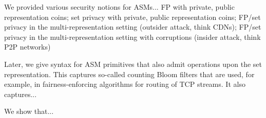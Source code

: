 We provided various security notions for ASMs... FP with private, public representation coins; set privacy with private, public representation coins; FP/set privacy in the multi-representation setting (outsider attack, think CDNs); FP/set privacy in the multi-representation setting with corruptions (insider attack, think P2P networks) 

Later, we give syntax for ASM primitives that also admit operations upon the set representation.  This captures so-called counting Bloom filters that are used, for example, in fairness-enforcing algorithms for routing of TCP streams.  It also captures... 

We show that... 










